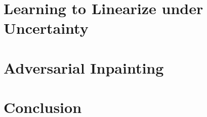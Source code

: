 \documentclass[12pt,letterpaper]{report}
\newcommand{\appendixchapter}[1]{%
    \refstepcounter{appendixchapter}%
    \refstepcounter{chapter}%
    \renewcommand{\DOTIS}[1]{\DOCH \DOTI{#1}}
    \chapter*{#1}
    \addcontentsline{apx}{appendixchapter}{Appendix \protect\numberline{\theappendixchapter}#1}\par%
    \vspace {-1.47cm}}
\renewcommand{\theappendixchapter}{\Alph{appendixchapter}}
\begin{document}
\chapter{Learning to Linearize under Uncertainty}
\label{chapter:error} 

\chapter{Adversarial Inpainting}
\label{chapter:uncertainty}
\chapter{Conclusion} 
\label{chapter:conclusion} 

\FloatBarrier
\clearpage



\FloatBarrier
\newpage

\singlespacing
\printbibliography
\end{document}

